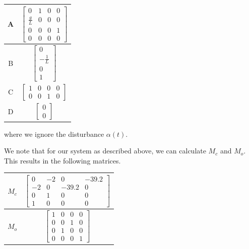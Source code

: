 \documentclass[10pt]{article}
\begin{document}
\begin{center}
    \begin{tabular}{| c | c |}
        \hline
        A & $\begin{bmatrix}
                0 & 1 & 0 & 0 \\
                \frac{g}{L} & 0 & 0 & 0 \\
                0 & 0 & 0 & 1 \\
                0 & 0 & 0 & 0
             \end{bmatrix}$ \\
        \hline
        B & $\begin{bmatrix}
                0 \\ -\frac{1}{L} \\ 0 \\ 1
             \end{bmatrix}$ \\
        \hline
        C & $\begin{bmatrix}
                1 & 0 & 0 & 0 \\
                0 & 0 & 1 & 0
             \end{bmatrix}$ \\
        \hline
        D & $\begin{bmatrix}
                0 \\ 0
             \end{bmatrix}$ \\
        \hline
    \end{tabular}
\end{center}

where we ignore the disturbance $\alpha(t)$.

We note that for our system as described above, we can calculate $M_c$ and $M_o$. This results in the following matrices.

\begin{center}
    \begin{tabular}{| c | c |}
        \hline
        $M_c$ & $\begin{bmatrix}
                0 & -2 & 0 & -39.2 \\
                -2 & 0 & -39.2 & 0 \\
                0 & 1 & 0 & 0 \\
                1 & 0 & 0 & 0
             \end{bmatrix}$ \\
        \hline
        $M_o$ & $\begin{bmatrix}
                1 & 0 & 0 & 0 \\
                0 & 0 & 1 & 0 \\
                0 & 1 & 0 & 0 \\
                0 & 0 & 0 & 1
             \end{bmatrix}$ \\
        \hline
    \end{tabular}
\end{center}
\end{document}

